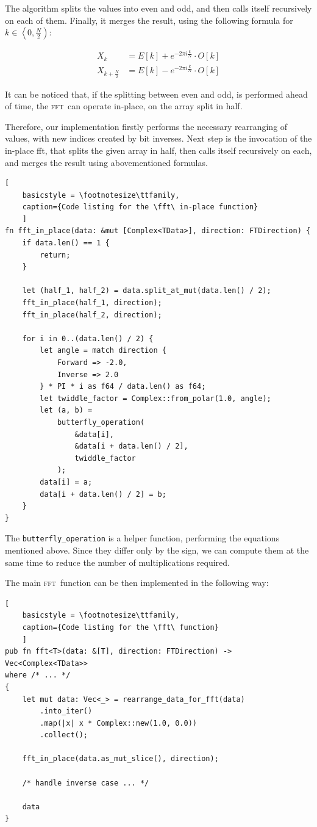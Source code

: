 \documentclass[12pt]{article}
\newcommand*{\fft}{\textsc{fft}}
\begin{document}
The algorithm splits the values into even and odd, and then calls itself recursively on each of them.
Finally, it merges the result, using the following formula for $k \in \left\langle 0, \frac{N}{2} \right)$:

\begin{align}
    X_k                 & =  E[k] + e^{-2\pi i\frac{k}{N}} \cdot O[k]  \\
    X_{k + \frac{N}{2}} & =  E[k] - e^{-2\pi i\frac{k}{N}} \cdot  O[k]
\end{align}

It can be noticed that, if the splitting between even and odd, is performed ahead of time, the \fft\ can operate in-place, on the array split in half.

Therefore, our implementation firstly performs the necessary rearranging of values, with new indices created by bit inverses.
Next step is the invocation of the in-place fft, that splits the given array in half, then calls itself recursively on each, and merges the result using abovementioned formulas.

\begin{lstlisting}[
    basicstyle = \footnotesize\ttfamily, 
    caption={Code listing for the \fft\ in-place function}
    ]
fn fft_in_place(data: &mut [Complex<TData>], direction: FTDirection) {
    if data.len() == 1 {
        return;
    }

    let (half_1, half_2) = data.split_at_mut(data.len() / 2);
    fft_in_place(half_1, direction);
    fft_in_place(half_2, direction);

    for i in 0..(data.len() / 2) {
        let angle = match direction {
            Forward => -2.0,
            Inverse => 2.0
        } * PI * i as f64 / data.len() as f64;
        let twiddle_factor = Complex::from_polar(1.0, angle);
        let (a, b) = 
            butterfly_operation(
                &data[i], 
                &data[i + data.len() / 2], 
                twiddle_factor
            );
        data[i] = a;
        data[i + data.len() / 2] = b;
    }
}
\end{lstlisting}

The \lstinline{butterfly_operation} is a helper function, performing the equations mentioned above.
Since they differ only by the sign, we can compute them at the same time to reduce the number of multiplications required.

The main \fft\ function can be then implemented in the following way:
\begin{lstlisting}[
    basicstyle = \footnotesize\ttfamily, 
    caption={Code listing for the \fft\ function}
    ]
pub fn fft<T>(data: &[T], direction: FTDirection) -> Vec<Complex<TData>>
where /* ... */
{
    let mut data: Vec<_> = rearrange_data_for_fft(data)
        .into_iter()
        .map(|x| x * Complex::new(1.0, 0.0))
        .collect();

    fft_in_place(data.as_mut_slice(), direction);
    
    /* handle inverse case ... */

    data
}
\end{lstlisting}
\end{document}
